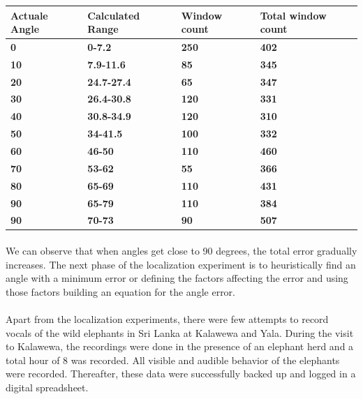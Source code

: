 \documentclass[12pt]{article}
\numberwithin{figure}{section}
\numberwithin{table}{section}
\begin{document}
\begin{table}[H]
\centering
\begin{tabular}{|m{}|m{}|m{}|m{}|} 
\hline
\bf {Actuale Angle} &  {\bf{ Calculated Range }} & {\bf{ Window count }} & {\bf{Total window count}}\\
\hline
\hline
\bf {0} &  {\bf{ 0-7.2  }} & {\bf{250 }} & {\bf{ 402 }}\\
\hline
\bf {10} &  {\bf{ 7.9-11.6 }} & {\bf{85 }} & {\bf{ 345 }}\\
\hline
\bf {20} &  {\bf{ 24.7-27.4 }} & {\bf{65 }} & {\bf{ 347 }}\\
\hline
\bf {30} &  {\bf{ 26.4-30.8 }} & {\bf{120 }} & {\bf{ 331 }}\\
\hline
\bf {40} &  {\bf{ 30.8-34.9 }} & {\bf{120 }} & {\bf{ 310 }}\\
\hline
\bf {50} &  {\bf{ 34-41.5 }} & {\bf{100 }} & {\bf{ 332 }}\\
\hline
\bf {60} &  {\bf{ 46-50}} & {\bf{ 110}} & {\bf{ 460 }}\\
\hline
\bf {70} &  {\bf{ 53-62 }} & {\bf{ 55 }} & {\bf{ 366}}\\
\hline
\bf {80} &  {\bf{ 65-69 }} & {\bf{ 110 }} & {\bf{ 431 }}\\
\hline
\bf {90} &  {\bf{ 65-79 }} & {\bf{ 110 }} & {\bf{ 384}}\\
\hline
\bf {90} &  {\bf{ 70-73 }} & {\bf{ 90 }} & {\bf{ 507}}\\
\hline
\end{tabular}
\end{table}


\paragraph{}
We can observe that when angles get close to 90 degrees, the total error gradually increases. The next phase of the localization experiment is to heuristically find an angle with a minimum error or defining the factors affecting the error and using those factors building an equation for the angle error.
\paragraph{}
Apart from the localization experiments, there were few attempts to record vocals of the wild elephants in Sri Lanka at Kalawewa and Yala. During the visit to Kalawewa, the recordings were done in the presence of an elephant herd and a total hour of 8 was recorded. All visible and audible behavior of the elephants were recorded. Thereafter, these data were successfully backed up and logged in a digital spreadsheet. 
\end{document}
